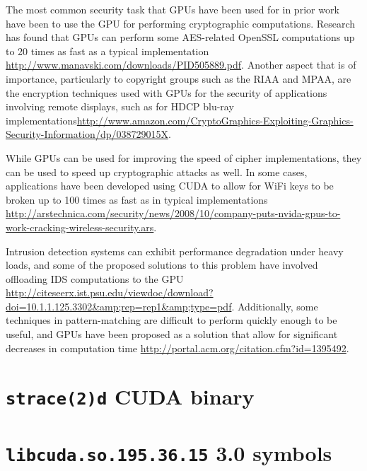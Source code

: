 \documentclass[letterpaper,10pt]{article}
\begin{document}
\begin{multicols}{2}
  The most common security task that GPUs have been used for in prior work have been to use the GPU for performing cryptographic computations. Research has found that GPUs can perform some AES-related OpenSSL computations up to 20 times as fast as a typical implementation
\url{http://www.manavski.com/downloads/PID505889.pdf}. Another aspect that is of importance, particularly to copyright groups such as the RIAA and MPAA, are the encryption techniques used with GPUs for the security of applications involving remote displays, such as for HDCP blu-ray implementations\url{http://www.amazon.com/CryptoGraphics-Exploiting-Graphics-Security-Information/dp/038729015X}.
  
  While GPUs can be used for improving the speed of cipher implementations, they can be used to speed up cryptographic attacks as well. In some cases, applications have been developed using CUDA to allow for WiFi keys to be broken up to 100 times as fast as in typical implementations \url{http://arstechnica.com/security/news/2008/10/company-puts-nvida-gpus-to-work-cracking-wireless-security.ars}.
  
  Intrusion detection systems can exhibit performance degradation under heavy
  loads, and some of the proposed solutions to this problem have involved
  offloading IDS computations to the GPU
  \url{http://citeseerx.ist.psu.edu/viewdoc/download?doi=10.1.1.125.3302&amp;rep=rep1&amp;type=pdf}.
  Additionally, some techniques in pattern-matching are difficult to perform
  quickly enough to be useful, and GPUs have been proposed as a solution that
  allow for significant decreases in computation time
  \url{http://portal.acm.org/citation.cfm?id=1395492}.



\end{multicols}
\appendix
\newpage
\section{\texttt{strace(2)d} CUDA binary}\label{strace}
\newpage
\section{\texttt{libcuda.so.195.36.15} 3.0 symbols}\label{strace}
\end{document}

